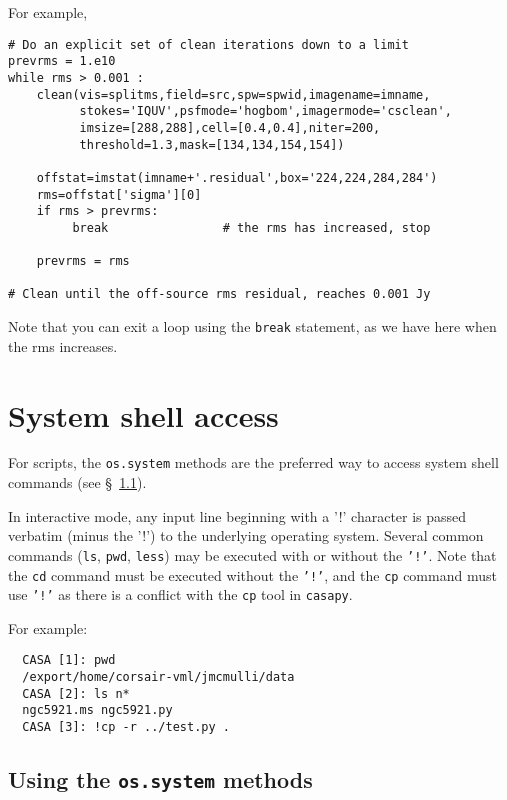 For example,
\small
\begin{verbatim}
# Do an explicit set of clean iterations down to a limit
prevrms = 1.e10
while rms > 0.001 :
    clean(vis=splitms,field=src,spw=spwid,imagename=imname,
          stokes='IQUV',psfmode='hogbom',imagermode='csclean',
          imsize=[288,288],cell=[0.4,0.4],niter=200,
          threshold=1.3,mask=[134,134,154,154])
    
    offstat=imstat(imname+'.residual',box='224,224,284,284')
    rms=offstat['sigma'][0]
    if rms > prevrms:
         break                # the rms has increased, stop
    
    prevrms = rms

# Clean until the off-source rms residual, reaches 0.001 Jy
\end{verbatim}
\normalsize
Note that you can exit a loop using the {\tt break} statement, as
we have here when the rms increases.

\section{System shell access}
\label{section:python.sys}

For scripts, the {\tt os.system} methods are the preferred way
to access system shell commands (see \S~\ref{section:python.sys.os}).

In interactive mode, any input line beginning with a '!' character is
passed verbatim (minus the '!') to the underlying operating system.
Several common commands ({\tt ls}, {\tt pwd}, {\tt less}) may be
executed with or without the {\tt '!'}.  Note that the {\tt cd} command must
be executed without the {\tt '!'}, and the {\tt cp} command must 
use {\tt '!'} as there is a conflict with the {\tt cp} tool in
{\tt casapy}.

For example:
\small
\begin{verbatim}
  CASA [1]: pwd
  /export/home/corsair-vml/jmcmulli/data
  CASA [2]: ls n*
  ngc5921.ms ngc5921.py
  CASA [3]: !cp -r ../test.py .
\end{verbatim}
\normalsize

\subsection{Using the {\tt os.system} methods}
\label{section:python.sys.os}

